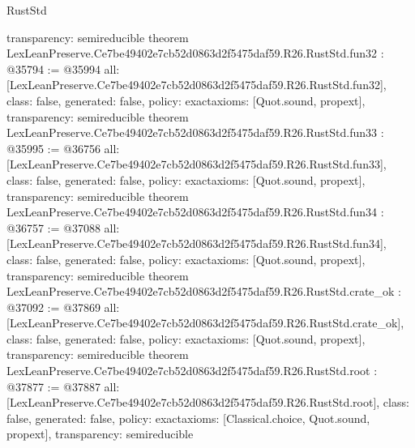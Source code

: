 \begin{lexlean}{RustStd}
\begin{coremodule}
{  transparency: semireducible
}
theorem LexLeanPreserve.Ce7be49402e7cb52d0863d2f5475daf59.R26.RustStd.fun32 : @35794 := @35994 {
  all: [LexLeanPreserve.Ce7be49402e7cb52d0863d2f5475daf59.R26.RustStd.fun32],
  class: false,
  generated: false,
  policy: exact{axioms: [Quot.sound, propext]},
  transparency: semireducible
}
theorem LexLeanPreserve.Ce7be49402e7cb52d0863d2f5475daf59.R26.RustStd.fun33 : @35995 := @36756 {
  all: [LexLeanPreserve.Ce7be49402e7cb52d0863d2f5475daf59.R26.RustStd.fun33],
  class: false,
  generated: false,
  policy: exact{axioms: [Quot.sound, propext]},
  transparency: semireducible
}
theorem LexLeanPreserve.Ce7be49402e7cb52d0863d2f5475daf59.R26.RustStd.fun34 : @36757 := @37088 {
  all: [LexLeanPreserve.Ce7be49402e7cb52d0863d2f5475daf59.R26.RustStd.fun34],
  class: false,
  generated: false,
  policy: exact{axioms: [Quot.sound, propext]},
  transparency: semireducible
}
theorem LexLeanPreserve.Ce7be49402e7cb52d0863d2f5475daf59.R26.RustStd.crate_ok : @37092 := @37869 {
  all: [LexLeanPreserve.Ce7be49402e7cb52d0863d2f5475daf59.R26.RustStd.crate_ok],
  class: false,
  generated: false,
  policy: exact{axioms: [Quot.sound, propext]},
  transparency: semireducible
}
theorem LexLeanPreserve.Ce7be49402e7cb52d0863d2f5475daf59.R26.RustStd.root : @37877 := @37887 {
  all: [LexLeanPreserve.Ce7be49402e7cb52d0863d2f5475daf59.R26.RustStd.root],
  class: false,
  generated: false,
  policy: exact{axioms: [Classical.choice, Quot.sound, propext]},
  transparency: semireducible
}


\end{coremodule}
\end{lexlean}
